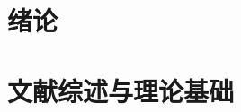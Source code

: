 \documentclass[
  oneside,
  degree=bachelor,
  field=humanities,
  fullwidthstop=circle,
  fontset=fandol,
  times=false,
  minted=false,
  biblatex=true,
]{tongjithesis}
\begin{document}

\MakeCover
\cleardoublepage
\MakeInfoPage
\cleardoublepage

\frontmatter


\clearpage
\tableofcontents
\cleardoublepage

\mainmatter

\chapter{绪论}


\chapter{文献综述与理论基础}
\label{sec:foundation}









\makereferences

\appendix


\backmatter

\end{document}
